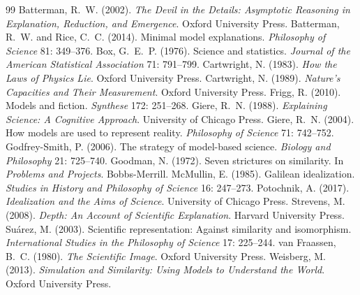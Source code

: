 \documentclass{situationist-preprint}
\begin{document}
\begin{thebibliography}{99}\small
{} Batterman, R.~W. (2002). \emph{The Devil in the Details: Asymptotic Reasoning in Explanation, Reduction, and Emergence}. Oxford University Press.
 Batterman, R.~W. and Rice, C.~C. (2014). Minimal model explanations. \emph{Philosophy of Science} 81: 349--376.
 Box, G.~E.~P. (1976). Science and statistics. \emph{Journal of the American Statistical Association} 71: 791--799.
 Cartwright, N. (1983). \emph{How the Laws of Physics Lie}. Oxford University Press.
 Cartwright, N. (1989). \emph{Nature's Capacities and Their Measurement}. Oxford University Press.
 Frigg, R. (2010). Models and fiction. \emph{Synthese} 172: 251--268.
 Giere, R.~N. (1988). \emph{Explaining Science: A Cognitive Approach}. University of Chicago Press.
 Giere, R.~N. (2004). How models are used to represent reality. \emph{Philosophy of Science} 71: 742--752.
 Godfrey-Smith, P. (2006). The strategy of model-based science. \emph{Biology and Philosophy} 21: 725--740.
 Goodman, N. (1972). Seven strictures on similarity. In \emph{Problems and Projects}. Bobbs-Merrill.
 McMullin, E. (1985). Galilean idealization. \emph{Studies in History and Philosophy of Science} 16: 247--273.
 Potochnik, A. (2017). \emph{Idealization and the Aims of Science}. University of Chicago Press.
 Strevens, M. (2008). \emph{Depth: An Account of Scientific Explanation}. Harvard University Press.
 Su\'arez, M. (2003). Scientific representation: Against similarity and isomorphism. \emph{International Studies in the Philosophy of Science} 17: 225--244.
 van Fraassen, B.~C. (1980). \emph{The Scientific Image}. Oxford University Press.
 Weisberg, M. (2013). \emph{Simulation and Similarity: Using Models to Understand the World}. Oxford University Press.
\end{thebibliography}
\end{document}
